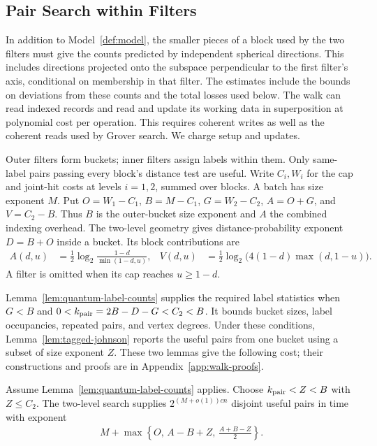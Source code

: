 \documentclass[runningheads,envcountsame,envcountsect,orivec]{llncs}
\begin{document}
\subsection{Pair Search within Filters}
\label{sec:q-geometry}
\label{q:tag-counts}


\begin{model}
\label{def:quantum-model}
In addition to Model~\ref{def:model}, the smaller pieces of a
block used by the two filters must give the counts predicted
by independent spherical directions. This includes directions
projected onto the subspace perpendicular to the first filter's
axis, conditional on membership in that filter. The estimates
include the bounds on deviations from these counts and the
total losses used below.
The walk can read indexed records and read and update its
working data in superposition at polynomial cost per operation.
This requires coherent writes as well as the coherent reads
used by Grover search. We charge setup and updates.
\end{model}


Outer filters form buckets; inner filters assign labels within them.
Only same-label pairs passing every block's distance test are useful.
Write $C_i,W_i$ for the cap and joint-hit costs at levels $i=1,2$,
summed over blocks. A batch has size exponent $M$. Put
$O=W_1-C_1$, $B=M-C_1$, $G=W_2-C_2$, $A=O+G$, and $V=C_2-B$.
Thus $B$ is the outer-bucket size exponent and $A$ the combined
indexing overhead. The two-level geometry gives distance-probability
exponent $D=B+O$ inside a bucket. Its block contributions are
\begin{align}
 A(d,u)&=\tfrac12\log_2\frac{1-d}{\min(1-d,u)},&
 V(d,u)&=\tfrac12\log_2\bigl(4(1-d)\max(d,1-u)\bigr).
 \label{eq:q-cap-contributions}
\end{align}
A filter is omitted when its cap reaches $u\ge1-d$.

Lemma~\ref{lem:quantum-label-counts} supplies the required label
statistics when $G<B$ and
$0<k_{\rm pair}=2B-D-G<C_2<B$. It bounds bucket sizes, label
occupancies, repeated pairs, and vertex degrees. Under these conditions,
Lemma~\ref{lem:tagged-johnson} reports the useful pairs from one bucket
using a subset of size exponent $Z$. These two lemmas give the
following cost; their constructions and proofs are in
Appendix~\ref{app:walk-proofs}.


\begin{lemma}
\label{lem:quantum-stage-cost}
Assume Lemma~\ref{lem:quantum-label-counts} applies.
Choose $k_{\rm pair}<Z<B$ with $Z\le C_2$.
The two-level search supplies $2^{(M+o(1))cn}$ disjoint
useful pairs in time with exponent
\begin{align}
 M+\max\!\left\{O,\, A-B+Z,\,\frac{A+B-Z}{2}\right\}.
 \label{q:tag-stage-cost}
\end{align}
\end{lemma}
\end{document}
